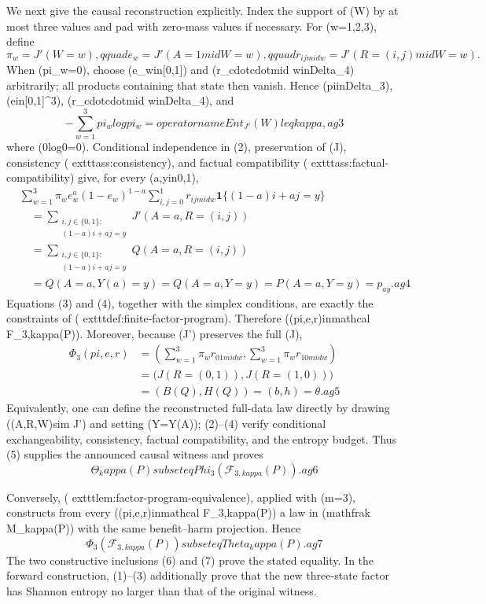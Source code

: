 We next give the causal reconstruction explicitly.  Index the support of (W) by at most three values and pad with zero-mass values if necessary.  For (w=1,2,3), define
\[
\pi_w=J'(W=w),qquad
e_w=J'(A=1mid W=w),qquad
r_{ijmid w}=J'(R=(i,j)mid W=w).
\]
When (pi_w=0), choose (e_win[0,1]) and (r_{cdotcdotmid w}inDelta_4) arbitrarily; all products containing that state then vanish.  Hence (piinDelta_3), (ein[0,1]^3), (r_{cdotcdotmid w}inDelta_4), and
\[
-\sum_{w=1}^3pi_wlogpi_w
=operatorname{Ent}_{J'}(W)leqkappa,   ag{3}
\]
where (0log0=0).  Conditional independence in (2), preservation of (J), consistency (  exttt{ass:consistency}), and factual compatibility (  exttt{ass:factual-compatibility}) give, for every (a,yin{0,1}),
\[
\begin{aligned}
&\sum_{w=1}^3\pi_w e_w^a(1-e_w)^{1-a}
 \sum_{i,j=0}^1 r_{ijmid w}
 \mathbf 1\{(1-a)i+aj=y\}\\
&\quad=
\sum_{\substack{i,j\in\{0,1\}:\\(1-a)i+aj=y}}
J'(A=a,R=(i,j))\\
&\quad=
\sum_{\substack{i,j\in\{0,1\}:\\(1-a)i+aj=y}}
Q(A=a,R=(i,j))\\
&\quad=Q(A=a,Y(a)=y)
=Q(A=a,Y=y)
=P(A=a,Y=y)
=p_{ay}.   ag{4}
\end{aligned}
\]
Equations (3) and (4), together with the simplex conditions, are exactly the constraints of (  exttt{def:finite-factor-program}).  Therefore ((pi,e,r)inmathcal F_{3,kappa}(P)).  Moreover, because (J') preserves the full (J),
\[
\begin{aligned}
\Phi_3(pi,e,r)
&=\left(\sum_{w=1}^3\pi_w r_{01mid w},
          \sum_{w=1}^3\pi_w r_{10mid w}\right)\\
&=\bigl(J(R=(0,1)),J(R=(1,0))\bigr)\\
&=(B(Q),H(Q))=(b,h)=\theta.   ag{5}
\end{aligned}
\]
Equivalently, one can define the reconstructed full-data law directly by drawing ((A,R,W)sim J') and setting (Y=Y(A)); (2)--(4) verify conditional exchangeability, consistency, factual compatibility, and the entropy budget.  Thus (5) supplies the announced causal witness and proves
\[
\Theta_kappa(P)subseteqPhi_3(\mathcal F_{3,kappa}(P)).   ag{6}
\]

Conversely, (  exttt{lem:factor-program-equivalence}), applied with (m=3), constructs from every ((pi,e,r)inmathcal F_{3,kappa}(P)) a law in (mathfrak M_kappa(P)) with the same benefit--harm projection.  Hence
\[
\Phi_3(\mathcal F_{3,kappa}(P))subseteqTheta_kappa(P).   ag{7}
\]
The two constructive inclusions (6) and (7) prove the stated equality.  In the forward construction, (1)--(3) additionally prove that the new three-state factor has Shannon entropy no larger than that of the original witness.